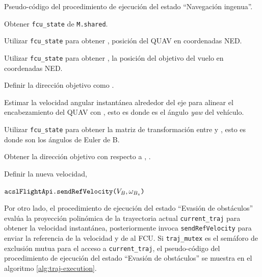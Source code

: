 \begin{algorithm}
\caption{Pseudo-código del procedimiento de ejecución del estado ``Navegación ingenua''. }
\label{alg:naive-execution}

Obtener \texttt{fcu\_state} de \texttt{M.shared}.

Utilizar \texttt{fcu\_state} para obtener , posición del QUAV en coordenadas NED.

Utilizar \texttt{fcu\_state} para obtener , la posición del objetivo del vuelo en coordenadas NED.

Definir la dirección objetivo como .

Estimar la velocidad angular instantánea alrededor del eje  para alinear el encabezamiento del QUAV con , esto es  donde \jim{\psi} es el ángulo \textit{yaw} del vehículo.

Utilizar \texttt{fcu\_state} para obtener la matriz de transformación entre  y , esto es  donde \jim{\phi,\theta,\psi} son los ángulos de Euler de B. 

Obtener la dirección objetivo con respecto a , .

Definir la nueva velocidad, 

$\text{\texttt{acslFlightApi.sendRefVelocity(}}V_{B}, \omega_{B_z}\text{\texttt{)}}$

\end{algorithm}

Por otro lado, el procedimiento de ejecución del estado ``Evasión de obstáculos'' evalúa la proyección polinómica de la trayectoria actual \texttt{current\_traj} para obtener la velocidad instantánea, posteriormente invoca \texttt{sendRefVelocity} para enviar la referencia de la velocidad y de  al FCU. Si \texttt{traj\_mutex} es el semáforo de exclusión mutua para el acceso a \texttt{current\_traj}, el pseudo-código del procedimiento de ejecución del estado ``Evasión de obstáculos'' se muestra en el algoritmo \ref{alg:traj-execution}.

